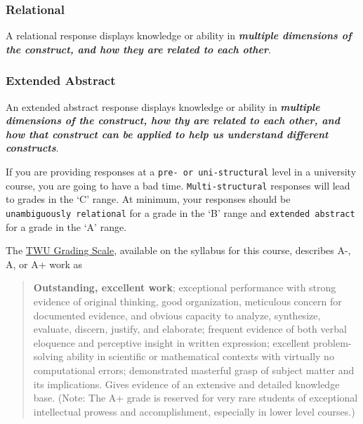 \documentclass[
]{book}
\begin{document}
\hypertarget{relational}{%
\subsubsection*{Relational}\label{relational}}

A relational response displays knowledge or ability in \textbf{\emph{multiple dimensions of the construct, and how they are related to each other}}.

\hypertarget{extended-abstract}{%
\subsubsection*{Extended Abstract}\label{extended-abstract}}

An extended abstract response displays knowledge or ability in \textbf{\emph{multiple dimensions of the construct, how thy are related to each other, and how that construct can be applied to help us understand different constructs}}.

If you are providing responses at a \texttt{pre-\ or\ uni-structural} level in a university course, you are going to have a bad time. \texttt{Multi-structural} responses will lead to grades in the `C' range. At minimum, your responses should be \texttt{unambiguously\ relational} for a grade in the `B' range and \texttt{extended\ abstract} for a grade in the `A' range.

The \href{https://www.twu.ca/about/policies-guidelines/university-standard-grading-system}{TWU Grading Scale}, available on the syllabus for this course, describes A-, A, or A+ work as

\begin{quote}
\textbf{Outstanding, excellent work}; exceptional performance with strong evidence of original thinking, good organization, meticulous concern for documented evidence, and obvious capacity to analyze, synthesize, evaluate, discern, justify, and elaborate; frequent evidence of both verbal eloquence and perceptive insight in written expression; excellent problem-solving ability in scientific or mathematical contexts with virtually no computational errors; demonstrated masterful grasp of subject matter and its implications. Gives evidence of an extensive and detailed knowledge base. (Note: The A+ grade is reserved for very rare students of exceptional intellectual prowess and accomplishment, especially in lower level courses.)
\end{quote}
\end{document}

